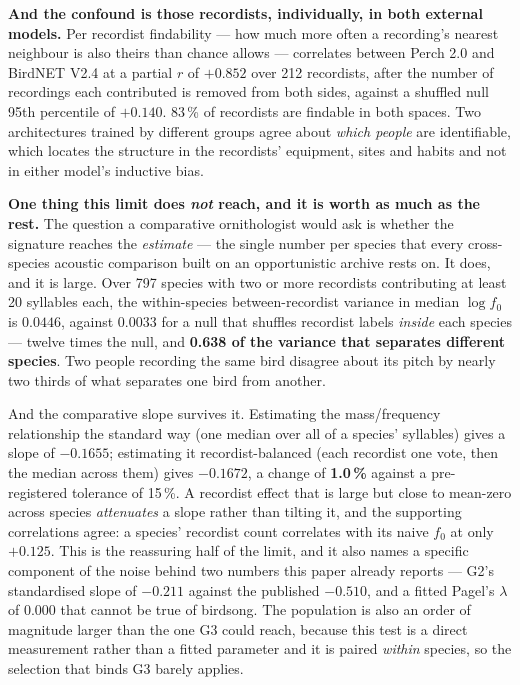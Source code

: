\documentclass[10pt,twocolumn,a4paper]{article}
\begin{document}
\textbf{And the confound is those recordists, individually, in both external models.} Per
recordist findability --- how much more often a recording's nearest neighbour is also theirs than
chance allows --- correlates between Perch 2.0 and BirdNET V2.4 at a partial $r$ of
$\mathbf{+0.852}$ over 212 recordists, after the number of recordings each contributed is removed
from both sides, against a shuffled null 95th percentile of $+0.140$. 83\,\% of recordists are
findable in both spaces. Two architectures trained by different groups agree about \emph{which
people} are identifiable, which locates the structure in the recordists' equipment, sites and
habits and not in either model's inductive bias.

\textbf{One thing this limit does \emph{not} reach, and it is worth as much as the rest.} The
question a comparative ornithologist would ask is whether the signature reaches the
\emph{estimate} --- the single number per species that every cross-species acoustic comparison
built on an opportunistic archive rests on. It does, and it is large. Over 797 species with two
or more recordists contributing at least 20 syllables each, the within-species
between-recordist variance in median $\log f_0$ is $0.0446$, against $0.0033$ for a null that
shuffles recordist labels \emph{inside} each species --- twelve times the null, and
\textbf{0.638 of the variance that separates different species}. Two people recording the same
bird disagree about its pitch by nearly two thirds of what separates one bird from another.

And the comparative slope survives it. Estimating the mass/frequency relationship the standard
way (one median over all of a species' syllables) gives a slope of $-0.1655$; estimating it
recordist-balanced (each recordist one vote, then the median across them) gives $-0.1672$, a
change of \textbf{1.0\,\%} against a pre-registered tolerance of 15\,\%. A recordist effect
that is large but close to mean-zero across species \emph{attenuates} a slope rather than
tilting it, and the supporting correlations agree: a species' recordist count correlates with
its naive $f_0$ at only $+0.125$. This is the reassuring half of the limit, and it also names a
specific component of the noise behind two numbers this paper already reports --- G2's
standardised slope of $-0.211$ against the published $-0.510$, and a fitted Pagel's $\lambda$ of
$0.000$ that cannot be true of birdsong. The population is also an order of magnitude larger
than the one G3 could reach, because this test is a direct measurement rather than a fitted
parameter and it is paired \emph{within} species, so the selection that binds G3 barely applies.
\end{document}

